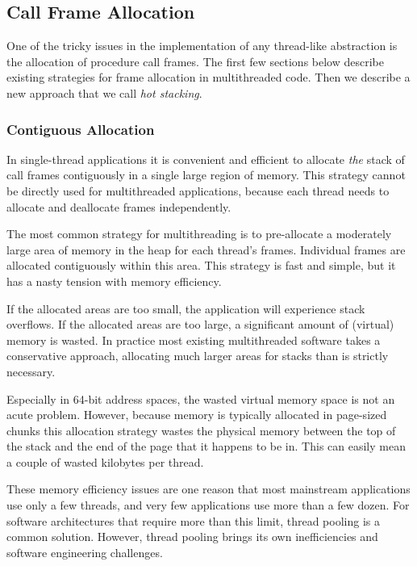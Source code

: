 \documentclass[a4paper,UKenglish,cleveref, autoref]{lipics-v2019}
\begin{document}
\subsection{Call Frame Allocation}

One of the tricky issues in the implementation of any thread-like abstraction is the allocation of procedure call frames.
The first few sections below describe existing strategies for frame allocation in multithreaded code.
Then we describe a new approach that we call \emph{hot stacking}.

\subsubsection{Contiguous Allocation}

In single-thread applications it is convenient and efficient to allocate \emph{the} stack of call frames contiguously in a single large region of memory.
This strategy cannot be directly used for multithreaded applications, because each thread needs to allocate and deallocate frames independently.

The most common strategy for multithreading is to pre-allocate a moderately large area of memory in the heap for each thread's frames.
Individual frames are allocated contiguously within this area.
This strategy is fast and simple, but it has a nasty tension with memory efficiency.

If the allocated areas are too small, the application will experience stack overflows.
If the allocated areas are too large, a significant amount of (virtual) memory is wasted.
In practice most existing multithreaded software takes a conservative approach, allocating much larger areas for stacks than is strictly necessary.

Especially in 64-bit address spaces, the wasted virtual memory space is not an acute problem.
However, because memory is typically allocated in page-sized chunks this allocation strategy wastes the physical memory between the top of the stack and the end of the page that it happens to be in.
This can easily mean a couple of wasted kilobytes per thread.

These memory efficiency issues are one reason that most mainstream applications use only a few threads, and very few applications use more than a few dozen.
For software architectures that require more than this limit, thread pooling is a common solution.
However, thread pooling brings its own inefficiencies and software engineering challenges.
\end{document}
